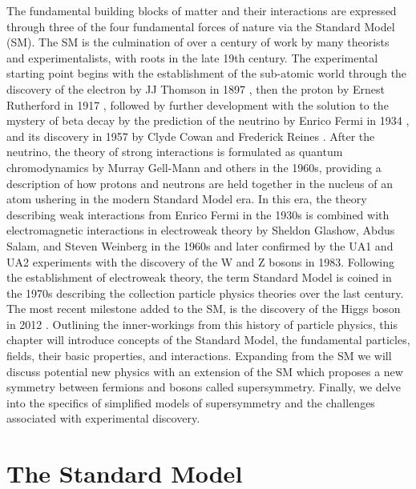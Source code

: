 The fundamental building blocks of matter and their interactions are expressed through three of the four fundamental forces of nature via the Standard Model (SM). The SM  is the culmination of over a century of work by many theorists and experimentalists, with roots in the late 19th century. The experimental starting point begins with the establishment of the sub-atomic world through the discovery of the electron by JJ Thomson in 1897 \cite{Thomson:1897cm}, then the proton by Ernest Rutherford in 1917 \cite{Rutherford:1911zz}, followed by further development with the solution to the mystery of beta decay by the prediction of the neutrino by Enrico Fermi in 1934 \cite{Fermi:1934hr}, and its discovery in 1957 by Clyde Cowan and Frederick Reines \cite{Reines:1956rs}.  After the neutrino,  the theory of strong interactions is formulated as quantum chromodynamics by Murray Gell-Mann and others in the 1960s, providing a description of how protons and neutrons are held together in the nucleus of an atom \cite{GellMann:1964nj} ushering in the modern Standard Model era. In this era, the theory describing weak interactions from Enrico Fermi in the 1930s is combined with electromagnetic interactions in electroweak theory by Sheldon Glashow, Abdus Salam, and Steven Weinberg in the 1960s \cite{GLASHOW1961579}\cite{Salam:1968rm}\cite{Weinberg:1967tq} and later confirmed by the UA1 and UA2 experiments with the discovery of the W and Z bosons in 1983\cite{arnison1983experimental}\cite{glashow1984future}. Following the establishment of electroweak theory, the term Standard Model is coined in the 1970s describing the collection particle physics theories over the last century. The most recent milestone added to the SM, is the discovery of the Higgs boson in 2012 \cite{CMS:2012qbp}\cite{ATLAS:2012yve}.  Outlining the inner-workings from this history of particle physics, this chapter will introduce concepts of the Standard Model, the fundamental particles, fields, their basic properties, and interactions. Expanding from the  SM we will discuss potential new physics with an extension of the SM which proposes a new symmetry between fermions and bosons called supersymmetry. Finally, we delve into the specifics of simplified models of supersymmetry and the challenges associated with experimental discovery.



\section{The Standard Model}

